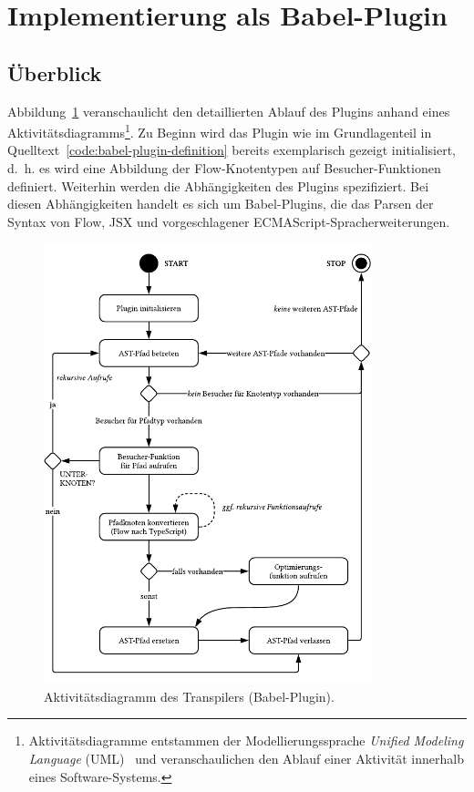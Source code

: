 \section{Implementierung als Babel-Plugin}
\subsection{Überblick}

Abbildung~\ref{fig:activity-diagram-plugin} veranschaulicht den detaillierten Ablauf des Plugins anhand eines Aktivitätsdiagramms\footnote{Aktivitätsdiagramme entstammen der Modellierungssprache \textit{Unified Modeling Language} (UML)~\autocite{OMG:UML} und veranschaulichen den Ablauf einer Aktivität innerhalb eines Software-Systems.}. Zu Beginn wird das Plugin wie im Grundlagenteil in Quelltext~\ref{code:babel-plugin-definition} bereits exemplarisch gezeigt initialisiert, d.~h. es wird eine Abbildung der Flow-Knotentypen auf Besucher-Funktionen definiert. Weiterhin werden die Abhängigkeiten des Plugins spezifiziert. Bei diesen Abhängigkeiten handelt es sich um Babel-Plugins, die das Parsen der Syntax von Flow, JSX und vorgeschlagener ECMAScript-Spracherweiterungen.


\begin{figure}[tbp]
  \centering
  \includegraphics[width=0.85\textwidth]{src/4_Umsetzung/fig/activity-diagram-plugin.pdf}
  \caption{Aktivitätsdiagramm des Transpilers (Babel-Plugin).}
  \label{fig:activity-diagram-plugin}
\end{figure}

